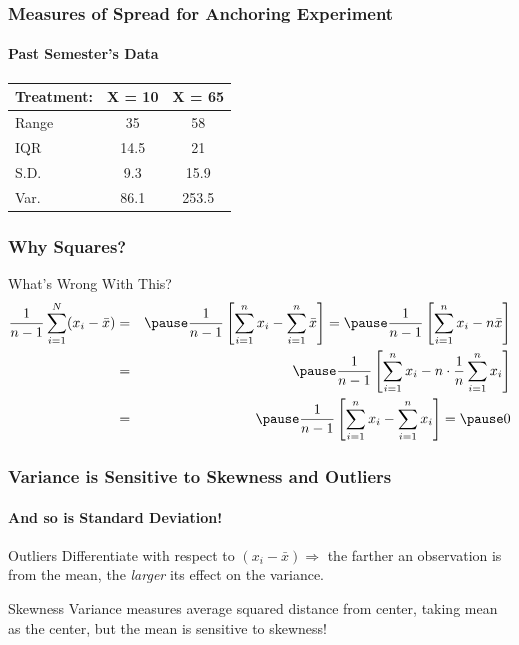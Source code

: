 \documentclass[handout]{beamer}
\begin{document}

\begin{frame}
\frametitle{Measures of Spread for Anchoring Experiment}
\framesubtitle{Past Semester's Data}

\begin{table}
	\begin{tabular}{l|cc}
	Treatment: & X = 10 & X = 65\\
	\hline
		Range&35&58\\
		IQR&14.5&21\\
		S.D.&9.3&15.9\\
		Var.&86.1&253.5
	\end{tabular}
\end{table}
\end{frame}


\begin{frame}
\frametitle{Why Squares?}
\begin{center}\end{center}
\begin{alertblock}{What's Wrong With This?}
	\begin{eqnarray*}
		\displaystyle\frac{1}{n-1}\sum_{i=1}^N (x_i - \bar{x}) &=& \pause\frac{1}{n-1}\left[\sum_{i=1}^n x_i - \sum_{i=1}^n \bar{x} \right] = \pause\frac{1}{n-1}\left[ \sum_{i=1}^n x_i  - n\bar{x}\right]\\
			&=& \pause \frac{1}{n-1}\left[ \sum_{i=1}^n x_i  - n\cdot\frac{1}{n} \sum_{i=1}^n x_i\right]\\ &=& \pause \frac{1}{n-1}\left[ \sum_{i=1}^n x_i  -  \sum_{i=1}^n x_i\right] =\pause 0
	\end{eqnarray*}
\end{alertblock}

\end{frame}

\begin{frame}
\frametitle{Variance is Sensitive to Skewness and Outliers}
\framesubtitle{And so is Standard Deviation!}
\begin{center}\end{center}


\begin{block}{Outliers}
Differentiate with respect to $(x_i-\bar{x})\Rightarrow$ the farther an observation is from the mean, the \emph{larger} its effect on the variance.
\end{block}


\begin{block}{Skewness}
Variance measures average squared distance from center, taking \alert{mean} as the center, but the mean is sensitive to skewness!
\end{block}

\end{frame}
\end{document}
